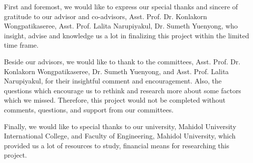 First and foremost, we would like to express our special thanks and sincere of gratitude to our advisor and co-advisors, Asst. Prof. Dr. Konlakorn Wongpatikaseree, Asst. Prof. Lalita Narupiyakul, Dr. Sumeth Yuenyong, who insight, advise and knowledge us a lot in finalizing this project within the limited time frame.

Beside our advisors, we would like to thank to the committees, Asst. Prof. Dr. Konlakorn Wongpatikaseree, Dr. Sumeth Yuenyong, and Asst. Prof. Lalita Narupiyakul, for their insightful comment and encouragement. Also, the questions which encourage us to rethink and research more about some factors which we missed. Therefore, this project would not be completed without comments, questions, and support from our committees.

Finally, we would like to special thanks to our university, Mahidol University International College, and Faculty of Engineering, Mahidol University, which provided us a lot of resources to study, financial means for researching this project.